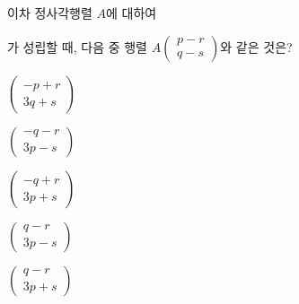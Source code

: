 이차 정사각행렬 $A$에 대하여\par\smallskip{}\par\smallskip\noindent 가 성립할 때, 다음 중 행렬 $A\begin{pmatrix} p-r \\ q-s \end{pmatrix}$와 같은 것은?
\begin{choices32}{\rule[-3.0ex]{0pt}{8.0ex}$\begin{pmatrix} -p+r \\ 3q+s \end{pmatrix}$}{\rule[-3.0ex]{0pt}{8.0ex}$\begin{pmatrix} -q-r \\ 3p-s \end{pmatrix}$}{\rule[-3.0ex]{0pt}{8.0ex}$\begin{pmatrix} -q+r \\ 3p+s \end{pmatrix}$}{\rule[-3.0ex]{0pt}{8.0ex}$\begin{pmatrix} q-r \\ 3p-s \end{pmatrix}$}{\rule[-3.0ex]{0pt}{8.0ex}$\begin{pmatrix} q-r \\ 3p+s \end{pmatrix}$}\end{choices32}
